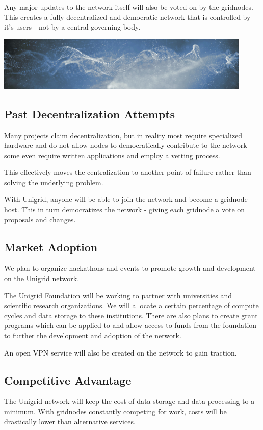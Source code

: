 \documentclass{article}
\begin{document}
Any major updates to the network itself will also be voted on by the gridnodes. This creates a fully decentralized and democratic network that is controlled 
by it's users - not by a central governing body.

\begin{mdframed}[style=textimage]
	\includegraphics[width=345pt]{abstract-particles}
\end{mdframed}

\subsection{Past Decentralization Attempts}
Many projects claim decentralization, but in reality most require specialized hardware and do not allow nodes to democratically contribute to the network - some even require written applications and employ a vetting process.

\noindent This effectively moves the centralization to another point of failure rather than solving the underlying problem.

With Unigrid, anyone will be able to join the network and become a gridnode host. This in turn democratizes the network - giving each gridnode a vote on proposals and changes.

\subsection{Market Adoption}
We plan to organize hackathons and events to promote growth and development on the Unigrid network. 

The Unigrid Foundation will be working to partner with universities and scientific research organizations. We will allocate a certain percentage of compute cycles and data storage to these institutions. There are also plans to create grant programs which can be applied to and allow access to funds from the foundation to further the development and adoption of the network.

An open VPN service will also be created on the network to gain traction.

\subsection{Competitive Advantage}
The Unigrid network will keep the cost of data storage and data processing to a minimum. With gridnodes constantly competing for work, costs will be drastically lower than alternative services.
\end{document}
